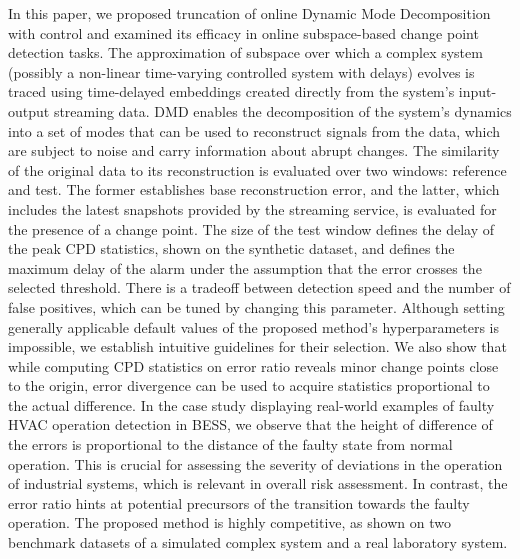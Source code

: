 In this paper, we proposed truncation of online Dynamic Mode Decomposition with control and examined its efficacy in online subspace-based change point detection tasks. The approximation of subspace over which a complex system (possibly a non-linear time-varying controlled system with delays) evolves is traced using time-delayed embeddings created directly from the system's input-output streaming data. DMD enables the decomposition of the system's dynamics into a set of modes that can be used to reconstruct signals from the data, which are subject to noise and carry information about abrupt changes. The similarity of the original data to its reconstruction is evaluated over two windows: reference and test. The former establishes base reconstruction error, and the latter, which includes the latest snapshots provided by the streaming service, is evaluated for the presence of a change point. The size of the test window defines the delay of the peak CPD statistics, shown on the synthetic dataset, and defines the maximum delay of the alarm under the assumption that the error crosses the selected threshold. There is a tradeoff between detection speed and the number of false positives, which can be tuned by changing this parameter. Although setting generally applicable default values of the proposed method's hyperparameters is impossible, we establish intuitive guidelines for their selection. We also show that while computing CPD statistics on error ratio reveals minor change points close to the origin, error divergence can be used to acquire statistics proportional to the actual difference. In the case study displaying real-world examples of faulty HVAC operation detection in BESS, we observe that the height of difference of the errors is proportional to the distance of the faulty state from normal operation. This is crucial for assessing the severity of deviations in the operation of industrial systems, which is relevant in overall risk assessment. In contrast, the error ratio hints at potential precursors of the transition towards the faulty operation. The proposed method is highly competitive, as shown on two benchmark datasets of a simulated complex system and a real laboratory system.
